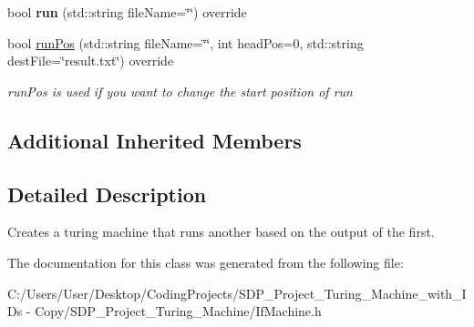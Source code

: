 \begin{DoxyCompactItemize}
\mbox{\label{class_if_machine_a1b9bc5b1593a6dc9b501a768f05a6fdc}} 
bool {\bfseries run} (std\+::string file\+Name=\char`\"{}\char`\"{}) override
\item 
\mbox{\label{class_if_machine_aec2e3335ee51e71f8195b49e77beebc3}} 
bool \mbox{\hyperlink{class_if_machine_aec2e3335ee51e71f8195b49e77beebc3}{run\+Pos}} (std\+::string file\+Name=\char`\"{}\char`\"{}, int head\+Pos=0, std\+::string dest\+File=\char`\"{}result.\+txt\char`\"{}) override
\begin{DoxyCompactList}\small\item\em run\+Pos is used if you want to change the start position of run \end{DoxyCompactList}\end{DoxyCompactItemize}
\subsection*{Additional Inherited Members}


\subsection{Detailed Description}
Creates a turing machine that runs another based on the output of the first. 

The documentation for this class was generated from the following file\+:\begin{DoxyCompactItemize}
\item 
C\+:/\+Users/\+User/\+Desktop/\+Coding\+Projects/\+S\+D\+P\+\_\+\+Project\+\_\+\+Turing\+\_\+\+Machine\+\_\+with\+\_\+\+I\+Ds -\/ Copy/\+S\+D\+P\+\_\+\+Project\+\_\+\+Turing\+\_\+\+Machine/If\+Machine.\+h\end{DoxyCompactItemize}
